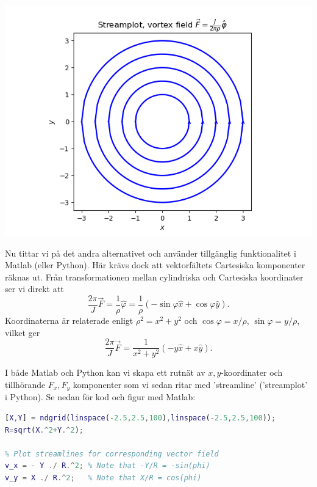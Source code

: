 \documentclass[%
oneside,                 %
final,                   %
10pt]{article}
\newenvironment{notice_mdfboxadmon}[1][]{
\begin{notice_mdfboxmdframed}[frametitle=#1]
}
{
\end{notice_mdfboxmdframed}
}
\begin{document}
\begin{notice_mdfboxadmon}
\vspace{6mm}

\centerline{\includegraphics[width=0.8\linewidth]{fig/streamlines-vortex-curves.png}}

\vspace{6mm}



Nu tittar vi på det andra alternativet och använder tillgänglig funktionalitet i Matlab (eller Python). Här krävs dock att vektorfältets Cartesiska komponenter räknas ut. Från transformationen mellan cylindriska och Cartesiska koordinater ser vi direkt att
\begin{equation*}
\frac{2\pi}{J} \vec{F} = \frac{1}{\rho} \hat\varphi = \frac{1}{\rho} \left( -\sin\varphi \hat{x} + \cos\varphi \hat y \right).
\end{equation*}
Koordinaterna är relaterade enligt $\rho^2 = x^2+y^2$ och $\cos\varphi = x/\rho$, $\sin\varphi = y/\rho$, vilket ger
\begin{equation*}
\frac{2\pi}{J} \vec{F} = \frac{1}{x^2+y^2} \left( -y \hat{x} + x \hat y \right).
\end{equation*}

I både Matlab och Python kan vi skapa ett rutnät av $x,y$-koordinater och tillhörande $F_x,F_y$ komponenter som vi sedan ritar med 'streamline' ('streamplot' i Python). Se nedan för kod och figur med Matlab:


\begin{lstlisting}[language=Matlab,style=blue1]
% Make an x,y grid
[X,Y] = ndgrid(linspace(-2.5,2.5,100),linspace(-2.5,2.5,100));
R=sqrt(X.^2+Y.^2);

% Plot streamlines for corresponding vector field
v_x = - Y ./ R.^2; % Note that -Y/R = -sin(phi)
v_y = X ./ R.^2;   % Note that X/R = cos(phi)


\end{lstlisting}
\end{notice_mdfboxadmon}
\end{document}
